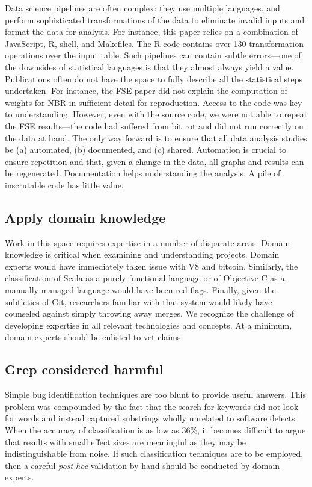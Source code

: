 \documentclass[acmsmall]{acmart}
\newcommand{\objc}{{\sf  Objective-C}\xspace}
\newcommand{\scala}{{\sf  Scala}\xspace}
\newcommand{\js}{{\sf  JavaScript}\xspace}
\begin{document}
Data science pipelines are often complex: they use multiple languages, and
perform sophisticated transformations of the data to eliminate invalid
inputs and format the data for analysis. For instance, this paper relies on
a combination of \js, {\sf\small R}, {\sf\small shell}, and {\sf\small
  Makefiles}. The {\sf\small R} code contains over 130 transformation
operations over the input table.  Such pipelines can contain subtle
errors---one of the downsides of statistical languages is that they almost
always yield a value. Publications often do not have the space to fully
describe all the statistical steps undertaken. For instance, the FSE paper
did not explain the computation of weights for NBR in sufficient detail for
reproduction.  Access to the code was key to understanding.  However, even
with the source code, we were not able to repeat the FSE results---the code
had suffered from bit rot and did not run correctly on the data at hand.
The only way forward is to ensure that all data analysis studies be (a)
automated, (b) documented, and (c) shared.  Automation is crucial to ensure
repetition and that, given a change in the data, all graphs and results can
be regenerated. Documentation helps understanding the analysis. A pile of
inscrutable code has little value.

\subsection{Apply domain knowledge} 
Work in this space requires expertise in a number of disparate areas.
Domain knowledge is critical when examining and understanding
projects. Domain experts would have immediately taken issue with V8 and
bitcoin. Similarly, the classification of \scala as a purely functional
language or of \objc as a manually managed language would have been red
flags. Finally, given the subtleties of Git, researchers familiar with that
system would likely have counseled against simply throwing away merges. We
recognize the challenge of developing expertise in all relevant technologies
and concepts. At a minimum, domain experts should be enlisted to vet claims.

\subsection{Grep considered harmful} 
Simple bug identification techniques are too blunt to provide useful
answers.  This problem was compounded by the fact that the search for
keywords did not look for words and instead captured substrings wholly
unrelated to software defects. When the accuracy of classification is as low
as 36\%, it becomes difficult to argue that results with small effect sizes
are meaningful as they may be indistinguishable from noise.  If such
classification techniques are to be employed, then a careful \emph{post hoc}
validation by hand should be conducted by domain experts.
\end{document}

